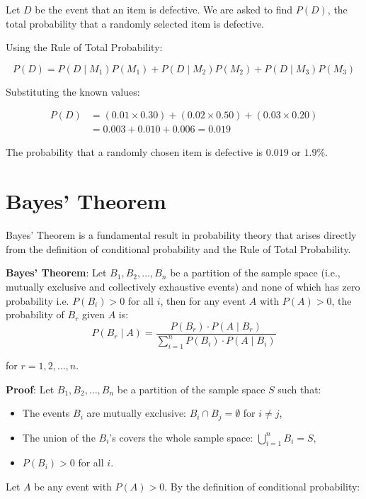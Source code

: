 \documentclass[twoside]{book}
\begin{document}
Let \( D \) be the event that an item is defective. We are asked to find \( P(D) \), the total probability that a randomly selected item is defective.

Using the Rule of Total Probability:

\[
P(D) = P(D \mid M_1)P(M_1) + P(D \mid M_2)P(M_2) + P(D \mid M_3)P(M_3)
\]

Substituting the known values:

\begin{align*}
    P(D) &= (0.01 \times 0.30) + (0.02 \times 0.50) + (0.03 \times 0.20) \\
    &= 0.003 + 0.010 + 0.006 = 0.019
\end{align*}

The probability that a randomly chosen item is defective is $0.019$ or $1.9$\%.


\section{Bayes' Theorem}
Bayes' Theorem is a fundamental result in probability theory that arises directly from the definition of conditional probability and the Rule of Total Probability. 
\begin{textbox}
    \textbf{Bayes' Theorem}: Let \( B_1, B_2, \ldots, B_n \) be a partition of the sample space (i.e., mutually exclusive and collectively exhaustive events) and none of which has zero probability i.e. \( P(B_i) > 0 \) for all \( i \), then for any event \( A \) with \( P(A) > 0 \), the probability of \( B_r \) given \( A \) is:
\[
P(B_r \mid A) = \frac{P(B_r) \cdot P(A \mid B_r)}{\sum_{i=1}^{n} P(B_i) \cdot P(A \mid B_i)}
\]

for \( r = 1, 2, \ldots, n \).
\end{textbox}
\textbf{Proof}: Let \( B_1, B_2, \ldots, B_n \) be a partition of the sample space \( S \) such that:
\begin{itemize}
    \item The events \( B_i \) are mutually exclusive: \( B_i \cap B_j = \emptyset \) for \( i \neq j \),
    \item The union of the \( B_i \)'s covers the whole sample space: \( \bigcup_{i=1}^n B_i = S \),
    \item \( P(B_i) > 0 \) for all \( i \).
\end{itemize}

Let \( A \) be any event with \( P(A) > 0 \). By the definition of conditional probability:
\end{document}
